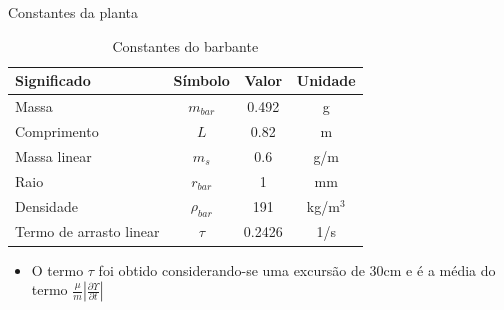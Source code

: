 \documentclass[10pt]{beamer}
\begin{document}
\begin{frame}[fragile]{Constantes da planta}

\begin{block}{}
\begin{table}[!ht]
	\centering
	\caption{Constantes do barbante\label{constanteBarbante}}
	\begin{tabular}{|l|c|c|c|}
		\hline
		\textbf{Significado} & \textbf{Símbolo} & \textbf{Valor} & \textbf{Unidade}\\ \hline \hline
		Massa & $m_{bar}$ & 0.492 & g\\ \hline
		Comprimento & $L$ & 0.82 & m \\ \hline
		Massa linear & $m_s$ & 0.6 & g/m\\ \hline
		Raio & $r_{bar}$ & 1 & mm\\ \hline
		Densidade & $\rho_{bar}$ & 191 & kg/m$^3$\\ \hline
		Termo de arrasto linear & $\tau$ & 0.2426 & 1/s\\ \hline
	\end{tabular}
	
\end{table}

\end{block}

\begin{block}{}
\begin{itemize}
	\item O termo $\tau$ foi obtido considerando-se uma excursão de 30cm e é a média do termo $\frac{\mu}{m}\left|\frac{\partial \Upsilon}{\partial t}\right|$
\end{itemize}	
\end{block}


\end{frame}
\end{document}

